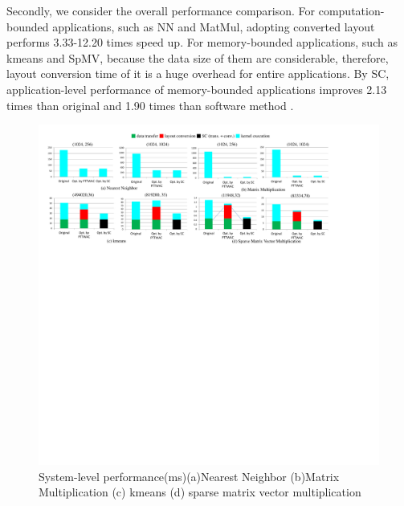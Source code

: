 \documentclass[10pt,journal,compsoc]{IEEEtran}
\begin{document}
Secondly, we consider the overall performance comparison.
For computation-bounded applications, such as NN and MatMul, adopting converted layout performs 3.33-12.20 times speed up.
For memory-bounded applications, such as kmeans and SpMV, because the data size of them are considerable,  therefore, layout conversion time of it is a huge overhead for entire applications. By SC, application-level performance of memory-bounded applications improves 2.13 times than original and  1.90 times than software method \cite{ASTA}.

\begin{figure}[tb]
\begin{center}
\graphicspath{{picture/}}
\includegraphics[width=\textwidth]{OverallComputation_06}
\caption{System-level performance(ms)(a)Nearest Neighbor (b)Matrix Multiplication (c) kmeans (d) sparse matrix vector multiplication }
\label{fig:OverallComputation}
\end{center}
\end{figure}
\end{document}
